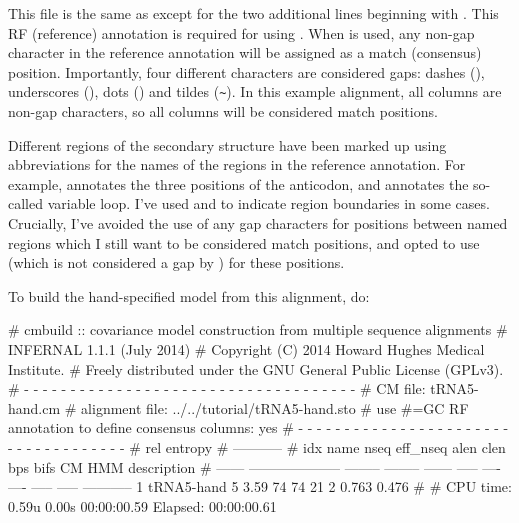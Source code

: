 This file is the same as  except for the two
additional lines beginning with . This RF (reference)
annotation is required for using . When 
is used, any non-gap character in the reference annotation will be
assigned as a match (consensus) position. Importantly, four different
characters are considered gaps: dashes (\otext{-}), underscores
(\otext{\_}), dots () and tildes (\verb+~+). In this example
alignment, all columns are non-gap characters, so all columns will be
considered match positions.

Different regions of the secondary structure have been marked up using
abbreviations for the names of the regions in the reference
annotation. For example,  annotates the three positions of
the anticodon, and \otext{[vlp]} annotates the so-called variable
loop. I've used \otext{[} and \otext{]} to indicate region boundaries
in some cases. Crucially, I've avoided the use of any gap characters
for positions between named regions which I still want to be
considered match positions, and opted to use \otext{=} (which is not
considered a gap by ) for these positions.

To build the hand-specified model from this alignment, do:


\begin{sreoutput}
# cmbuild :: covariance model construction from multiple sequence alignments
# INFERNAL 1.1.1 (July 2014)
# Copyright (C) 2014 Howard Hughes Medical Institute.
# Freely distributed under the GNU General Public License (GPLv3).
# - - - - - - - - - - - - - - - - - - - - - - - - - - - - - - - - - - - -
# CM file:                                            tRNA5-hand.cm
# alignment file:                                     ../../tutorial/tRNA5-hand.sto
# use #=GC RF annotation to define consensus columns: yes
# - - - - - - - - - - - - - - - - - - - - - - - - - - - - - - - - - - - -
#                                                                      rel entropy
#                                                                      -----------
# idx    name                     nseq eff_nseq   alen  clen  bps bifs    CM   HMM description
# ------ -------------------- -------- -------- ------ ----- ---- ---- ----- ----- -----------
       1 tRNA5-hand                  5     3.59     74    74   21    2 0.763 0.476 
#
# CPU time: 0.59u 0.00s 00:00:00.59 Elapsed: 00:00:00.61
\end{sreoutput}

